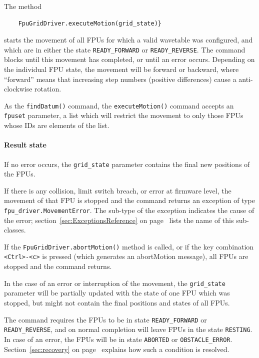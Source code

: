 \documentclass[11pt,a4paper]{scrartcl}
\begin{document}
\begin{sloppypar}
  The method
  \begin{verbatim}
    FpuGridDriver.executeMotion(grid_state)}
  \end{verbatim}
  starts the movement of all FPUs for which a valid wavetable was
  configured, and which are in either the state
  \texttt{READY\_FORWARD} or \texttt{READY\_REVERSE}. The command
  blocks until this movement has completed, or until an error
  occurs. Depending on the individual FPU state, the movement will be
  forward or backward, where ``forward'' means that increasing step
  numbers (positive differences) cause a anti-clockwise rotation.
\end{sloppypar}

As the \texttt{findDatum()} command, the \texttt{executeMotion()}
command accepts an \texttt{fpuset} parameter, a list which will
restrict the movement to only those FPUs whose IDs are elements of the
list.

\paragraph{Result state}
If no error occurs, the \texttt{grid\_state} parameter contains the
final new positions of the FPUs.

If there is any collision, limit switch breach, or error at firmware
level, the movement of that FPU is stopped and the command returns an
exception of type \texttt{fpu\_driver.MovementError}. The sub-type of
the exception indicates the cause of the error;
section~\ref{sec:ExceptionsReference} on
page~\pageref{sec:ExceptionsReference} lists the name of this
sub-classes.

If the \texttt{FpuGridDriver.abortMotion()} method is called, or if
the key combination \texttt{<Ctrl>-<c>} is pressed (which generates an
abortMotion message), all FPUs are stopped and the command returns.

In the case of an error or interruption of the movement, the
\texttt{grid\_state} parameter will be partially updated with the
state of one FPU which was stopped, but might not contain the final
positions and states of all FPUs.

The command requires the FPUs to be in state \texttt{READY\_FORWARD}
or \texttt{READY\_REVERSE}, and on normal completion will leave FPUs
in the state \texttt{RESTING}. In case of an error, the FPUs will be
in state \texttt{ABORTED} or \texttt{OBSTACLE\_ERROR}.
Section~\ref{sec:recovery} on page~\pageref{sec:recovery} explains how
such a condition is resolved.
\end{document}
